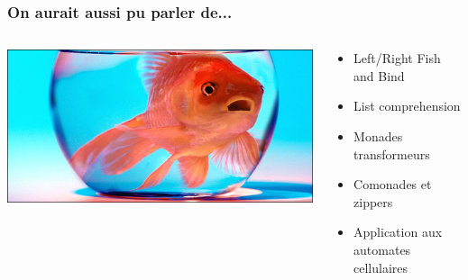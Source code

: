 \documentclass{beamer}
\begin{document}
\begin{frame}[fragile]
  \frametitle{On aurait aussi pu parler de...}
\begin{columns}[T]
  \begin{column}{0.5\textwidth}
    \includegraphics[scale=0.3]{goldfish}
  \end{column}
  \begin{column}{0.5\textwidth}
    \begin{itemize}
      \item Left/Right Fish and Bind
      \item List comprehension
      \item Monades transformeurs
      \item Comonades et zippers
      \item Application aux automates cellulaires
    \end{itemize}
  \end{column}
\end{columns}
\end{frame}
\end{document}
